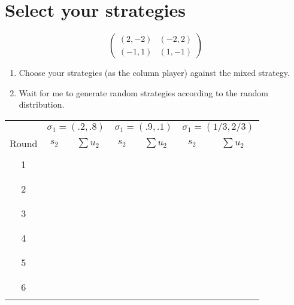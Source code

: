\documentclass{article}
\begin{document}
\section{Select your strategies}


$$\begin{pmatrix}
(2,-2) & (-2, 2)\\
(-1,1) & (1,-1)
\end{pmatrix}$$

\begin{enumerate}
\item Choose your strategies (as the column player) against the mixed strategy.
\item Wait for me to generate random strategies according to the random distribution.
\end{enumerate}
\vspace{1cm}

\begin{center}
\begin{tabular}{c|c|c|c|c|c|c}
\toprule
& \multicolumn{2}{c|}{$\sigma_1 = (.2,.8)$} & \multicolumn{2}{|c|}{$\sigma_1 = (.9,.1)$} & \multicolumn{2}{|c}{$\sigma_1=(1/3,2/3)$}\\
Round&$s_2$&$\sum u_2$&$s_2$&$\sum u_2$&$s_2$&$\sum u_2$\\
\midrule
&&&&&&\\
1&&&&&&\\
&&&&&&\\
&&&&&&\\
2&&&&&&\\
&&&&&&\\
&&&&&&\\
3&&&&&&\\
&&&&&&\\
&&&&&&\\
4&&&&&&\\
&&&&&&\\
&&&&&&\\
5&&&&&&\\
&&&&&&\\
&&&&&&\\
6&&&&&&\\
&&&&&&\\
\bottomrule
\end{tabular}
\end{center}
\end{document}

